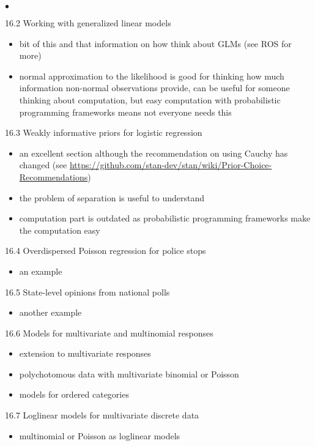 \documentclass[a4paper,11pt]{article}
\begin{document}
\begin{list}{$\bullet$}{\parsep=0pt\itemsep=2pt}
\begin{itemize}
\begin{itemize}
    \end{itemize}
  \end{itemize}
  \item[16.2] Working with generalized linear models
  \begin{itemize}
  \item bit of this and that information on how think about GLMs (see
    ROS for more)
  \item normal approximation to the likelihood is good for thinking
    how much information non-normal observations provide, can be
    useful for someone thinking about computation, but easy
    computation with probabilistic programming frameworks means not
    everyone needs this
  \end{itemize}
  \item[16.3] Weakly informative priors for logistic regression
    \begin{itemize}
    \item an excellent section although the recommendation on using
      Cauchy has changed (see
      \url{https://github.com/stan-dev/stan/wiki/Prior-Choice-Recommendations})
    \item the problem of separation is useful to understand
    \item computation part is outdated as probabilistic programming
      frameworks make the computation easy
    \end{itemize}
  \item[16.4] Overdispersed Poisson regression for police stops
    \begin{itemize}
    \item an example
    \end{itemize}
  \item[16.5] State-level opinions from national polls
    \begin{itemize}
    \item another example
    \end{itemize}
  \item[16.6] Models for multivariate and multinomial responses
    \begin{itemize}
    \item extension to multivariate responses
    \item polychotomous data with multivariate binomial or Poisson
    \item models for ordered categories
    \end{itemize}
  \item[16.7] Loglinear models for multivariate discrete data
    \begin{itemize}
    \item multinomial or Poisson as loglinear models
    \end{itemize}
  \end{list}
\end{document}
